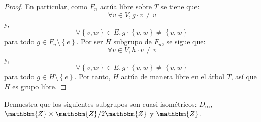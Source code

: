 \documentclass[12pt]{report}
\theoremstyle{largebreak}
\newcommand{\bbm}[1]{\ensuremath{\mathbbm{#1}}}
\begin{document}
\begin{proof}
        En particular, como $F_n$ actúa libre sobre $T$ se tiene que:
        \begin{equation*}
            \forall v\in V, g\cdot v\neq v
        \end{equation*}
        y,
        \begin{equation*}
            \forall\left\{v,w \right\}\in E, g\cdot\left\{v,w \right\}\neq \left\{v,w \right\}
        \end{equation*}
        para todo $g\in F_n\setminus\left\{e\right\}$. Por ser $H$ subgrupo de $F_n$, se sigue que:
        \begin{equation*}
            \forall v\in V, h\cdot v\neq v
        \end{equation*}
        y,
        \begin{equation*}
            \forall\left\{v,w \right\}\in E, g\cdot\left\{v,w \right\}\neq \left\{v,w \right\}
        \end{equation*}
        para todo $g\in H\setminus\left\{e\right\}$. Por tanto, $H$ actúa de manera libre en el árbol $T$, así que $H$ es grupo libre.
    \end{proof}

    \begin{excer}
        Demuestra que los siguientes subgrupos son cuasi-isométricos: $D_\infty$, $\bbm{Z}\times\bbm{Z}/2\bbm{Z}$ y $\bbm{Z}$.
    \end{excer}
\end{document}
